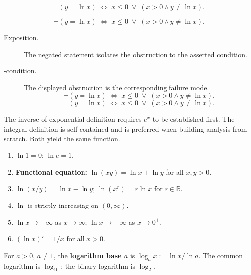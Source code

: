 \begin{remark*}
\[
  \neg(y=\ln x)
  \;\iff\;
  x \leq 0 \;\vee\; (x>0 \wedge y\neq\ln x).
\]
\end{remark*}

\begin{remark*}
\[
\neg(y=\ln x)
  \;\iff\;
  x \leq 0 \;\vee\; (x>0 \wedge y\neq\ln x).
\]
\end{remark*}

\begin{remark*}
\begin{description}
  \item[Exposition.]
  The negated statement isolates the obstruction to the asserted condition.

  \item[\neq-condition.]
  The displayed obstruction is the corresponding failure mode.
  \[
\neg(y=\ln x)
  \;\iff\;
  x \leq 0 \;\vee\; (x>0 \wedge y\neq\ln x).
  \]
  \[
\neg(y=\ln x)
  \;\iff\;
  x \leq 0 \;\vee\; (x>0 \wedge y\neq\ln x).
  \]
\end{description}
\end{remark*}



\begin{remark*}[Interpretation]
The inverse-of-exponential definition requires $e^x$ to be
established first. The integral definition is self-contained and
is preferred when building analysis from scratch. Both yield the
same function.


\begin{enumerate}[label=(\roman*)]
  \item $\ln 1 = 0$;\; $\ln e = 1$.
  \item \textbf{Functional equation:} $\ln(xy) = \ln x + \ln y$
    for all $x, y > 0$.
  \item $\ln(x/y) = \ln x - \ln y$;\;
    $\ln(x^r) = r\ln x$ for $r \in \mathbb{R}$.
  \item $\ln$ is strictly increasing on $(0,\infty)$.
  \item $\ln x \to +\infty$ as $x \to \infty$;\;
    $\ln x \to -\infty$ as $x \to 0^+$.
  \item $(\ln x)' = 1/x$ for all $x > 0$.
\end{enumerate}


For $a > 0$, $a \neq 1$, the \textbf{logarithm base $a$} is
$\log_a x := \ln x / \ln a$. The common logarithm is $\log_{10}$;
the binary logarithm is $\log_2$.
\end{remark*}


